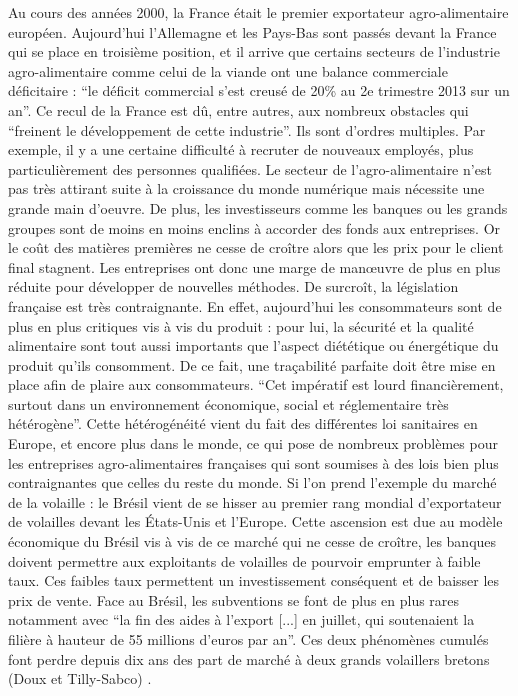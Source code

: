 \documentclass[a4paper,12pt]{report}
\begin{document}
			Au cours des années 2000, la France était le premier exportateur agro-alimentaire européen. Aujourd'hui l’Allemagne et les Pays-Bas sont passés devant la France qui se place en troisième position, et il arrive que certains secteurs de l’industrie agro-alimentaire comme celui de la viande ont une balance commerciale déficitaire : “le déficit commercial s'est creusé de 20\% au 2e trimestre 2013 sur un an”\cite{DeficitCommercialViandeAggrave}.
			Ce recul de la France est dû, entre autres, aux nombreux obstacles qui “freinent le développement de cette industrie”\cite{StimulerCompetitiviteEntreprises}. Ils sont d’ordres multiples. Par exemple, il y a une certaine difficulté à recruter de nouveaux employés, plus particulièrement des personnes qualifiées. Le secteur de l’agro-alimentaire n’est pas très attirant suite à la croissance du monde numérique mais nécessite une grande main d’oeuvre.
			De plus, les investisseurs comme les banques ou les grands groupes sont de moins en moins enclins à accorder des fonds aux entreprises. Or le coût des matières premières ne cesse de croître alors que les prix pour le client final stagnent. Les entreprises ont donc une marge de manœuvre de plus en plus réduite pour développer de nouvelles méthodes. De surcroît, la législation française est très contraignante. En effet, aujourd’hui les consommateurs sont de plus en plus critiques vis à vis du produit : pour lui, la sécurité et la qualité alimentaire sont tout aussi importants que l’aspect diététique ou énergétique du produit qu’ils consomment. De ce fait, une traçabilité parfaite doit être mise en place afin de plaire aux consommateurs. “Cet impératif est lourd financièrement, surtout dans un environnement économique, social et réglementaire très hétérogène”\cite{SecteurAAFrancaisEnjeuxXXISiecle}. Cette hétérogénéité vient du fait des différentes loi sanitaires en Europe, et encore plus dans le monde, ce qui pose de nombreux problèmes pour les entreprises agro-alimentaires françaises qui sont soumises à des lois bien plus contraignantes que celles du reste du monde. Si l’on prend l’exemple du marché de la volaille : le Brésil vient de se hisser au premier rang mondial d’exportateur de volailles devant les États-Unis et l’Europe. Cette ascension est due au modèle économique du Brésil vis à vis de ce marché qui ne cesse de croître, les banques doivent permettre aux exploitants de volailles de pourvoir emprunter à faible taux. Ces faibles taux permettent un investissement conséquent et de baisser les prix de vente. Face au Brésil, les subventions se font de plus en plus rares notamment avec “la fin des aides à l'export [...] en juillet, qui soutenaient la filière à hauteur de 55 millions d'euros par an”.\cite{PouletBresilienMoinsCherBreton} Ces deux phénomènes cumulés font perdre depuis dix ans des part de marché à deux grands volaillers bretons (Doux et Tilly-Sabco) .
			
\end{document}
